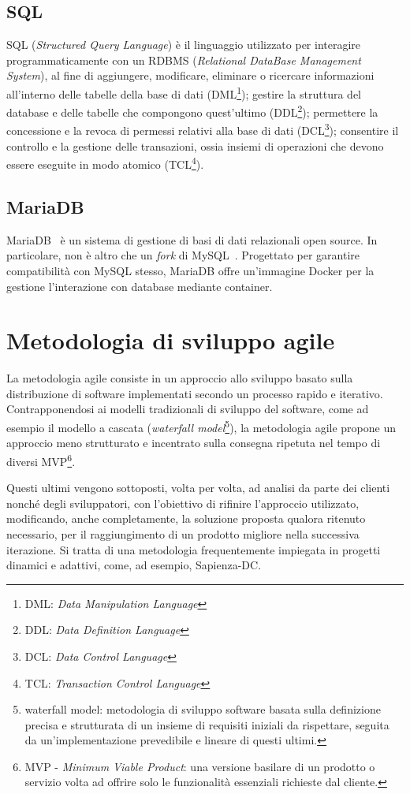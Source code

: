 \subsection{SQL}
SQL (\textit{Structured Query Language}) è il linguaggio utilizzato per interagire programmaticamente con un RDBMS (\textit{Relational DataBase Management System}), al fine di aggiungere, modificare, eliminare o ricercare informazioni all'interno delle tabelle della base di dati (DML\footnote{DML: \textit{Data Manipulation Language}}); gestire la struttura del database e delle tabelle che compongono quest'ultimo (DDL\footnote{DDL: \textit{Data Definition Language}}); permettere la concessione e la revoca di permessi relativi alla base di dati (DCL\footnote{DCL: \textit{Data Control Language}}); consentire il controllo e la gestione delle transazioni, ossia insiemi di operazioni che devono essere eseguite in modo atomico (TCL\footnote{TCL: \textit{Transaction Control Language}}).         
\subsection{MariaDB}
MariaDB~\cite{mariadb_docs} è un sistema di gestione di basi di dati relazionali open source. In particolare, non è altro che un \textit{fork} di MySQL~\cite{mysql_docs}. Progettato per garantire compatibilità con MySQL stesso, MariaDB offre un'immagine Docker per la gestione l'interazione con database mediante container.

\section{Metodologia di sviluppo agile}
La metodologia agile consiste in un approccio allo sviluppo basato sulla distribuzione di software implementati secondo un processo rapido e iterativo. Contrapponendosi ai modelli tradizionali di sviluppo del software, come ad esempio il modello a cascata (\textit{waterfall model}\footnote{waterfall model: metodologia di sviluppo software basata sulla definizione precisa e strutturata di un insieme di requisiti iniziali da rispettare, seguita da un'implementazione prevedibile e lineare di questi ultimi.}), la metodologia agile propone un approccio meno strutturato e incentrato sulla consegna ripetuta nel tempo di diversi MVP\footnote{MVP - \textit{Minimum Viable Product}: una versione basilare di un prodotto o servizio volta ad offrire solo le funzionalità essenziali richieste dal cliente.}.

Questi ultimi vengono sottoposti, volta per volta, ad analisi da parte dei clienti nonché degli sviluppatori, con l'obiettivo di rifinire l'approccio utilizzato, modificando, anche completamente, la soluzione proposta qualora ritenuto necessario, per il raggiungimento di un prodotto migliore nella successiva iterazione. Si tratta di una metodologia frequentemente impiegata in progetti dinamici e adattivi, come, ad esempio, Sapienza-DC.

